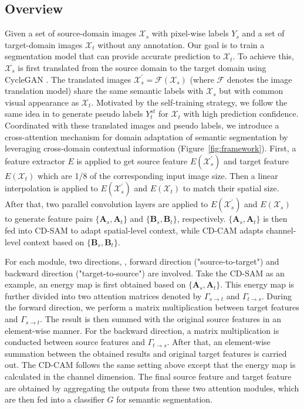 \documentclass[10pt,twocolumn,letterpaper]{article}
\begin{document}
	\subsection{Overview}

	Given a set of source-domain images $ \mathcal{X}_s $ with pixel-wise labels $ Y_s $ and a set of target-domain images $ \mathcal{X}_t $ without any annotation. Our goal is to train a segmentation model that can provide accurate prediction to $ \mathcal{X}_t $. To achieve this, $ \mathcal{X}_s $ is first translated from the source domain to the target domain using CycleGAN \cite{zhu2017unpaired}. The translated images $ \mathcal{X}^{'}_s=\mathcal{F}(\mathcal{X}_s) $ (where $ \mathcal{F} $ denotes the image translation model) share the same semantic labels with $ \mathcal{X}_s $ but with common visual appearance as $ \mathcal{X}_t $. Motivated by the self-training strategy, we follow the same idea in \cite{li2019bidirectional} to generate pseudo labels $ Y^{st}_t $ for $ \mathcal{X}_t $ with high prediction confidence. Coordinated with these translated images and pseudo labels, we introduce a cross-attention mechanism for domain adaptation of semantic segmentation by leveraging cross-domain contextual information (Figure~\ref{fig:framework}). First, a feature extractor $ E $ is applied to get source feature $ E(\mathcal{X}^{'}_s) $ and target feature $ E(\mathcal{X}_t) $ which are 1/8 of the corresponding input image size. Then a linear interpolation is applied to $ E(\mathcal{X}^{'}_s) $ and $ E(\mathcal{X}_t) $ to match their spatial size. After that, two parallel convolution layers are applied to $ E(\mathcal{X}^{'}_s) $ and $ E(\mathcal{X}_s) $ to generate feature pairs $ \{\textbf{A}_{s}, \textbf{A}_{t}\} $ and $ \{\textbf{B}_{s}, \textbf{B}_{t}\} $, respectively. $ \{\textbf{A}_{s}, \textbf{A}_{t}\} $ is then fed into CD-SAM to adapt spatial-level context, while CD-CAM adapts channel-level context based on $ \{ \textbf{B}_{s}, \textbf{B}_{t}\} $.


	For each module, two directions, \ie, forward direction ("source-to-target") and backward direction ("target-to-source") are involved. Take the CD-SAM as an example, an energy map is first obtained based on $ \{\textbf{A}_{s}, \textbf{A}_{t}\} $. This energy map is further divided into two attention matrices denoted by $ \Gamma_{s{\rightarrow}t} $ and $ \Gamma_{t{\rightarrow}s} $. During the forward direction, we perform a matrix multiplication between target features and $ \Gamma_{s{\rightarrow}t} $. The result is then summed with the original source features in an element-wise manner. For the backward direction, a matrix multiplication is conducted between source features and $ \Gamma_{t{\rightarrow}s} $. After that, an element-wise summation between the obtained results and original target features is carried out. The CD-CAM follows the same setting above except that the energy map is calculated in the channel dimension. The final source feature and target feature are obtained by aggregating the outputs from these two attention modules, which are then fed into a classifier $ G $ for semantic segmentation.
\end{document}
